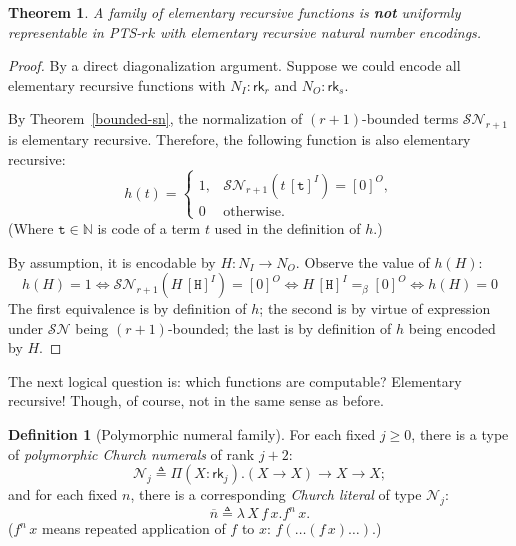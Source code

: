 \documentclass{article}
\newtheorem{theorem}{Theorem}
\theoremstyle{definition}
\newtheorem{definition}{Definition}
\theoremstyle{remark}
\begin{document}
\begin{theorem}\label{uniform-elementary}
    A family of elementary recursive functions
    is \textbf{not} uniformly representable in
    PTS-$rk$ with elementary recursive natural
    number encodings.
\end{theorem}
\begin{proof}
    By a direct diagonalization argument. Suppose we
    could encode all elementary recursive functions
    with $N_I:\mathsf{rk}_r$ and $N_O:\mathsf{rk}_s$.

    By Theorem~\ref{bounded-sn}, the normalization of
    $(r+1)$-bounded terms $\mathcal{SN}_{r+1}$ is
    elementary recursive. Therefore, the following
    function is also elementary recursive:
    \[
        h(t) = \begin{cases}
            1,&\mathcal{SN}_{r+1}(t\,[\mathtt{t}]^I)
            =[0]^O,\\
            0&\text{otherwise}.
        \end{cases}
    \]
    (Where $\mathtt{t}\in\mathbb{N}$ is code of a term
    $t$ used in the definition of $h$.)

    By assumption, it is encodable by $H:N_I\to N_O$.
    Observe the value of $h(H)$:
    \[
        h(H)=1\Leftrightarrow
        \mathcal{SN}_{r+1}(H\,[\mathtt{H}]^I)=[0]^O
        \Leftrightarrow
        H\,[\mathtt{H}]^I =_\beta [0]^O
        \Leftrightarrow
        h(H)=0
    \]
    The first equivalence is by definition of $h$; the
    second is by virtue of expression under
    $\mathcal{SN}$ being $(r+1)$-bounded; the last is
    by definition of $h$ being encoded by $H$.
\end{proof}

The next logical question is: which functions are
computable? Elementary recursive! Though, of course,
not in the same sense as before.

\begin{definition}[Polymorphic numeral family]
    For each fixed $j\ge 0$, there is a type of
    \emph{polymorphic Church numerals} of rank $j+2$:
    \[ \mathcal{N}_j \triangleq \Pi(X:\mathsf{rk}_j).
        (X\to X)\to X\to X;
    \]
    and for each fixed $n$, there is a corresponding
    \emph{Church literal} of type $\mathcal{N}_j$:
    \[
        \overline{n}\triangleq
        \lambda\,X\,f\,x.f^n\,x.
    \]
    ($f^n\,x$ means repeated application of $f$ to $x$:
    $f(\ldots(f\,x)\ldots)$.)
\end{definition}
\end{document}
